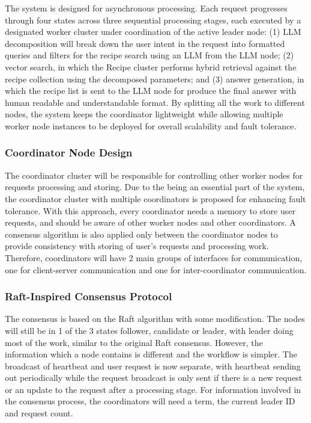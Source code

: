 \documentclass[conference]{IEEEtran}
\begin{document}
The system is designed for asynchronous processing.  Each request progresses through four states across three sequential processing stages, each executed by a designated worker cluster under coordination of the active leader node: (1) LLM decomposition will break down the user intent in the request into formatted queries and filters for the recipe search using an LLM from the LLM node; (2) vector search, in which the Recipe cluster performs hybrid retrieval against the recipe collection using the decomposed parameters; and (3) answer generation, in which the recipe list is sent to the LLM node for produce the final answer with  human readable and understandable format.
By splitting all the work to different nodes, the system keeps the coordinator lightweight while allowing multiple worker node instances to be deployed for overall scalability and fault tolerance.

\subsubsection{Coordinator Node Design}
The coordinator cluster will be responsible for controlling other worker nodes for requests processing and storing. Due to the being an essential part of the system, the coordinator cluster with multiple coordinators is proposed for enhancing fault tolerance. With this approach, every coordinator needs a memory to store user requests, and should be aware of other worker nodes and other coordinators.  A consensus algorithm is also applied only between the coordinator nodes to provide consistency with storing of user’s requests and processing work. Therefore, coordinators will have 2 main groups of interfaces for communication, one for client-server communication and one for inter-coordinator communication.

\subsubsection{Raft-Inspired Consensus Protocol}
The consensus is based on the Raft algorithm \cite{Ongaro2014InSO} with some modification. The nodes will still be in 1 of the 3 states follower, candidate or leader, with leader doing most of the work, similar to the original Raft consensus. However, the information which a node contains is different and the workflow is simpler. The broadcast of heartbeat and user request is now separate, with heartbeat sending out periodically while the request broadcast is only sent if there is a new request or an update to the request after a processing stage. For information involved in the consensus process, the coordinators will need a term, the current leader ID and request count.
\end{document}
